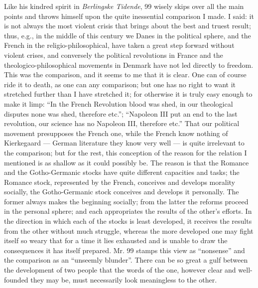\documentclass[12pt,a4paper,openany]{book}
\newcommand{\opage}[1]{\marginnote{\footnotesize\textit{[#1]}}}
\begin{document}
Like his kindred spirit in \emph{Berlingske Tidende}, 99 wisely
skips over all the main points and throws himself upon the
quite inessential comparison I made. I said: it is not always
the most violent crisis that brings about the best and truest
result; thus, e.g., in the middle of this century we Danes in
the political sphere, and the French in the religio-philosophical,
have taken a great step forward without violent crises, and
conversely the political revolutions in France and the
theologico-philosophical movements in Denmark have not led
directly to freedom. This was the comparison, and it seems to me
\opage{103}that it is clear. One can of course ride it to death, as one
can any comparison; but one has no right to want it stretched
further than I have stretched it; for otherwise it is truly easy
enough to make it limp: ``In the French Revolution blood was
shed, in our theological disputes none was shed, therefore
etc.''; ``Napoleon III put an end to the last revolution, our
science has no Napoleon III, therefore etc.'' That our political
movement presupposes the French one, while the French know
nothing of Kierkegaard --- German literature they know very well
--- is quite irrelevant to the comparison; but for the rest, this
conception of the reason for the relation I mentioned is as
shallow as it could possibly be. The reason is that the Romance
and the Gotho-Germanic stocks have quite different capacities
and tasks; the Romance stock, represented by the French,
conceives and develops morality socially, the Gotho-Germanic
stock conceives and develops it personally. The former always
makes the beginning socially; from the latter the reforms
proceed in the personal sphere; and each appropriates the
results of the other's efforts. In the direction in which each
of the stocks is least developed, it receives the results from
the other without much struggle, whereas the more developed one
may fight itself so weary that for a time it lies exhausted and
is unable to draw the consequences it has itself prepared. Mr. 99
stamps this view as ``nonsense'' and the comparison as an
``unseemly blunder''. There can
be so great a gulf between the development of two people that
the words of the one, however clear and well-founded they may
be, must necessarily look meaningless to the other.
\end{document}
